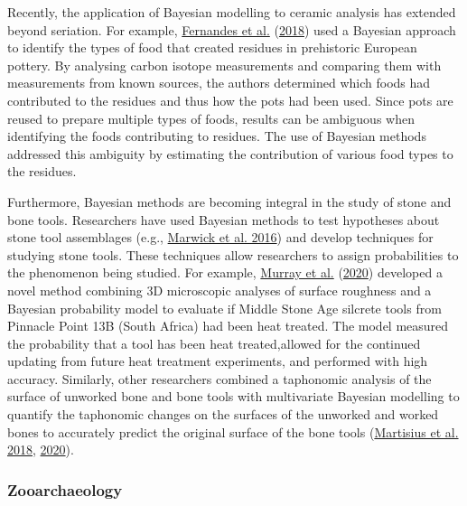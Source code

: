 \documentclass[
]{article}
\begin{document}
Recently, the application of Bayesian modelling to ceramic analysis has
extended beyond seriation. For example,
\protect\hyperlink{ref-fernandes_reconstruction_2018}{Fernandes et al.}
(\protect\hyperlink{ref-fernandes_reconstruction_2018}{2018}) used a
Bayesian approach to identify the types of food that created residues in
prehistoric European pottery. By analysing carbon isotope measurements
and comparing them with measurements from known sources, the authors
determined which foods had contributed to the residues and thus how the
pots had been used. Since pots are reused to prepare multiple types of
foods, results can be ambiguous when identifying the foods contributing
to residues. The use of Bayesian methods addressed this ambiguity by
estimating the contribution of various food types to the residues.

Furthermore, Bayesian methods are becoming integral in the study of
stone and bone tools. Researchers have used Bayesian methods to test
hypotheses about stone tool assemblages (e.g.,
\protect\hyperlink{ref-marwick_early_2016}{Marwick et al. 2016}) and
develop techniques for studying stone tools. These techniques allow
researchers to assign probabilities to the phenomenon being studied. For
example, \protect\hyperlink{ref-murray_new_2020}{Murray et al.}
(\protect\hyperlink{ref-murray_new_2020}{2020}) developed a novel method
combining 3D microscopic analyses of surface roughness and a Bayesian
probability model to evaluate if Middle Stone Age silcrete tools from
Pinnacle Point 13B (South Africa) had been heat treated. The model
measured the probability that a tool has been heat treated,allowed for
the continued updating from future heat treatment experiments, and
performed with high accuracy. Similarly, other researchers combined a
taphonomic analysis of the surface of unworked bone and bone tools with
multivariate Bayesian modelling to quantify the taphonomic changes on
the surfaces of the unworked and worked bones to accurately predict the
original surface of the bone tools
(\protect\hyperlink{ref-martisius_time_2018}{Martisius et al. 2018},
\protect\hyperlink{ref-martisius_method_2020}{2020}).

\hypertarget{zooarchaeology}{%
\subsubsection{Zooarchaeology}\label{zooarchaeology}}
\end{document}
